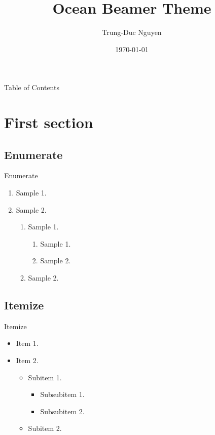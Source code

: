 \documentclass[10pt]{beamer}
\title[Ocean Beamer Theme]{\huge Ocean Beamer Theme}
\author[ngntrgduc]{\large Trung-Duc Nguyen}
\institute[HCMUS]{
  \inst{}
  \large University of Science - VNUHCM \\Faculty of Mathematics and Computer Science\\
}
\date{\today}
\begin{document}
\begin{frame}[plain] %
    \maketitle 
\end{frame}

\begin{frame}{Table of Contents}
    \tableofcontents[subsectionstyle=hide]
\end{frame}

\section{First section}
\subsection{Enumerate}
\begin{frame}{Enumerate}
    \begin{enumerate}
        \item Sample 1.
        \item Sample 2.
            \begin{enumerate}
                \item Sample 1.
                    \begin{enumerate}
                        \item Sample 1.
                        \item Sample 2.
                    \end{enumerate}
                \item Sample 2.
            \end{enumerate}
    \end{enumerate}
\end{frame}

\subsection{Itemize}
\begin{frame}{Itemize}
    \begin{itemize}
        \item Item 1.
        \item Item 2.
            \begin{itemize}
                \item Subitem 1.
                    \begin{itemize}
                        \item Subsubitem 1.
                        \item Subsubitem 2.
                    \end{itemize}
                \item Subitem 2.
            \end{itemize}
    \end{itemize}
\end{frame}
\end{document}
